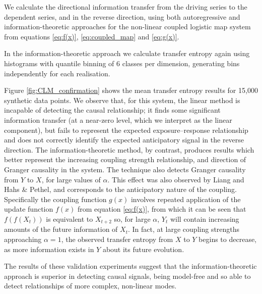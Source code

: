 \documentclass[]{rsos}%
\begin{document}
  We calculate the directional information transfer from the driving series to the dependent series, and in the reverse direction, using both autoregressive and information-theoretic approaches for the non-linear coupled logistic map system from equations \ref{eq:f(x)}, \ref{eq:coupled_map} and \ref{eq:g(x)}.  

  In the information-theoretic approach we calculate transfer entropy again using histograms with quantile binning of 6 classes per dimension, generating bins independently for each realisation.
  

  Figure \ref{fig:CLM_confirmation} shows the mean transfer entropy results for 15,000 synthetic data points. We observe that, for this system, the linear method is incapable of detecting the causal relationship; it finds some significant information transfer (at a near-zero level, which we interpret as the linear component), but fails to represent the expected exposure–response relationship and does not correctly identify the expected anticipatory signal in the reverse direction. The information-theoretic method, by contrast, produces results which better represent the increasing coupling strength relationship, and direction of {\color{blue}Granger} causality in the system. The technique also detects {\color{blue}Granger} causality from $Y$ to $X$, for large values of $\alpha$. This effect was also observed by Liang and Hahs \& Pethel, and corresponds to the anticipatory nature of the coupling. Specifically the coupling function $g(x)$ involves repeated application of the update function $f(x)$ from equation \ref{eq:f(x)}, from which it can be seen that $f(f(X_t))$ is equivalent to $X_{t+2}$ so, for large $\alpha$, $Y_t$ will contain increasing amounts of the future information of $X_t$. In fact, at large coupling strengths approaching $\alpha=1$, the observed transfer entropy from $X$ to $Y$ begins to decrease, as more information exists in $Y$ about its future evolution.

  The results of these validation experiments suggest that the information-theoretic approach is superior in detecting causal signals, being model-free and so able to detect relationships of more complex, non-linear modes.
\end{document}
